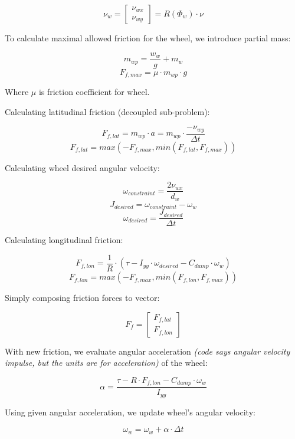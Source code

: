 \documentclass[a4paper,11pt]{article}
\begin{document}
\begin{center}
\[
\nu_w = 
\begin{bmatrix}
\nu_{wx} \\
\nu_{wy}
\end{bmatrix}
=R(\Phi_w) \cdot \nu
\]
\end{center}

To calculate maximal allowed friction for the wheel, we introduce partial mass:
\begin{center}
\[
m_{wp} = \frac{w_w}{g} + m_w
\]
\[
F_{f, max} = \mu \cdot m_{wp} \cdot g
\]
\end{center}
Where $\mu$ is friction coefficient for wheel.

Calculating latitudinal friction (decoupled sub-problem):
\begin{center}
\[
F_{f,lat} = m_{wp} \cdot a = m_{wp} \cdot \frac{-\nu_{wy}}{\Delta t}
\]
\[
F_{f,lat} = max(-F_{f,max}, min(F_{f,lat}, F_{f,max}))
\]
\end{center}

Calculating wheel desired angular velocity:

\begin{center}
\[
\omega_{constraint} = \frac{2\nu_{wx}}{d_w}
\]
\[
J_{desired} = \omega_{constraint} - \omega_w
\]
\[
\omega_{desired} = \frac{J_{desired}}{\Delta t}
\]
\end{center}


Calculating longitudinal friction:
\begin{center}
\[
F_{f,lon} = \frac{1}{R} \cdot (\tau - I_{yy}\cdot \omega_{desired} - C_{damp} \cdot \omega_w)
\]
\[
F_{f,lon} = max(-F_{f,max}, min(F_{f,lon}, F_{f,max}))
\]
\end{center}

Simply composing friction forces to vector:
\begin{center}
\[
F_f = 
\begin{bmatrix}
F_{f,lat} \\
F_{f,lon}
\end{bmatrix}
\]
\end{center}

With new friction, we evaluate angular acceleration \textit{(code says angular velocity impulse, but the units are for acceleration)}  of the wheel:
\begin{center}
\[
\alpha = \frac{ \tau - R \cdot F_{f,lon} - C_{damp} \cdot \omega_w}{I_{yy}}
\]
\end{center}

Using given angular acceleration, we update wheel's angular velocity:
\begin{center}
$$
\omega_w = \omega_w + \alpha \cdot \Delta t
$$
\end{center}
\end{document}
